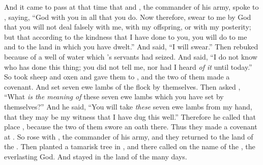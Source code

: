 
\bverse And it came to pass at that time that \Abimelech and , the commander of his army, spoke to \Abraham, saying, ``God \is with you in all that you do.
\bverse Now therefore, swear to me by God that you will not deal falsely with me, with my offspring, or with my posterity; but that according to the kindness that I have done to you, you will do to me and to the land in which you have dwelt.''
\bverse And \Abraham said, ``I will swear.''
\bverse Then \Abraham rebuked \Abimelech because of a well of water which \Abimelech's servants had seized.
\bverse And \Abimelech said, ``I do not know who has done this thing; you did not tell me, nor had I heard \textit{of it} until today.''
\bverse So \Abraham took sheep and oxen and gave them to \Abimelech, and the two of them made a covenant.
\bverse And \Abraham set seven ewe lambs of the flock by themselves.
\bverse Then \Abimelech asked \Abraham, ``What \textit{is the meaning of} these seven ewe lambs which you have set by themselves?''
\bverse And he said, ``You will take \textit{these} seven ewe lambs from my hand, that they may be my witness that I have dug this well.''
\bverse Therefore he called that place \Beersheba, because the two of them swore an oath there.
\bverse Thus they made a covenant at \Beersheba.  So \Abimelech rose with , the commander of his army, and they returned to the land of the .
\bverse Then \textit{\Abraham} planted a tamarisk tree in \Beersheba, and there called on the name of the \lord, the everlasting God.
\bverse And \Abraham stayed in the land of the  many days.
